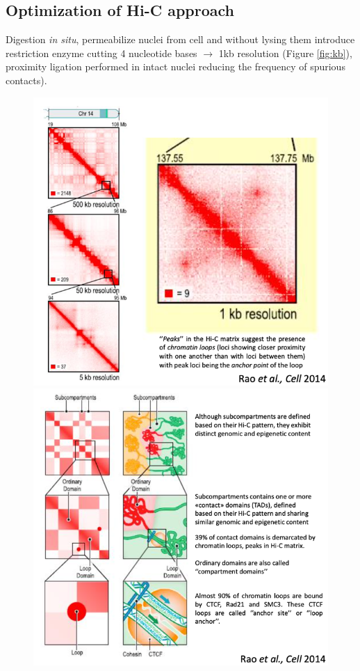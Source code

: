 \hypertarget{optimization-of-hi-c-approach}{%
\subsection{Optimization of Hi-C approach}\label{optimization-of-hi-c-approach}}

Digestion \emph{in situ}, permeabilize nuclei from cell and without lysing them introduce restriction enzyme cutting 4 nucleotide bases $\rightarrow$ 1kb resolution (Figure \ref{fig:kb}), proximity ligation performed in intact nuclei reducing the frequency of spurious contacts).

\begin{figure}[!htb]
   \begin{minipage}{0.48\textwidth}
     \centering
     \includegraphics[width=0.7\linewidth]{../_resources/Screenshot_2022-10-19_at_09-10-50.png}
     \caption{}\label{fig:kb}
   \end{minipage}\hfill
   \begin{minipage}{0.48\textwidth}
     \centering
     \includegraphics[width=0.7\linewidth]{../_resources/Screenshot_2022-10-19_at_09-11-30.png}
     \caption{}\label{fig:sub}
   \end{minipage}
\end{figure}

